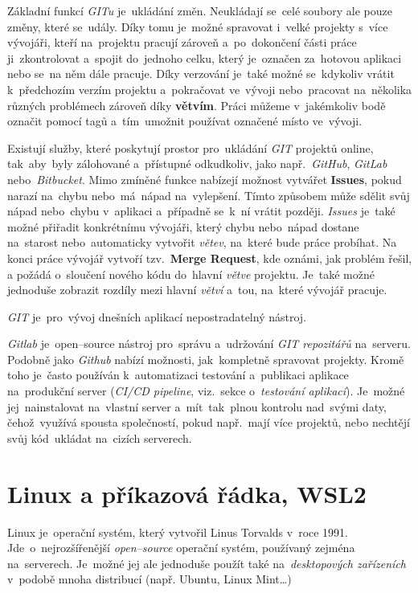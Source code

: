 \documentclass[11pt,a4paper]{report}
\begin{document}
            Základní funkcí \emph{GITu} je~ukládání změn. Neukládají se~celé soubory ale pouze změny, které se~udály. Díky tomu je~možné spravovat i~velké projekty s~více vývojáři, kteří na~projektu pracují zároveň a~po~dokončení části práce ji~zkontrolovat a~spojit do~jednoho celku, který je~označen za~hotovou aplikaci nebo se~na něm dále pracuje. Díky verzování je~také možné se~kdykoliv vrátit k~předchozím verzím projektu a~pokračovat ve~vývoji nebo~pracovat na~několika různých problémech zároveň díky \textbf{větvím}. Práci můžeme v~jakémkoliv bodě označit pomocí tagů a~tím~umožnit používat označené místo ve~vývoji.

            Existují služby, které poskytují prostor pro~ukládání \emph{GIT} projektů online, tak~aby~byly zálohované a~přístupné odkudkoliv, jako např.~\emph{GitHub}, \emph{GitLab} nebo~\emph{Bitbucket}. Mimo zmíněné funkce nabízejí možnost vytvářet \textbf{Issues}, pokud narazí na~chybu nebo~má~nápad na~vylepšení. Tímto způsobem může sdělit svůj nápad nebo~chybu v~aplikaci a~případně se~k~ní vrátit později. \emph{Issues} je~také možné přiřadit konkrétnímu vývojáři, který chybu nebo~nápad dostane na~starost nebo~automaticky vytvořit \emph{větev}, na~které bude práce probíhat. Na konci práce vývojář vytvoří tzv.~\textbf{Merge Request}, kde oznámi, jak problém řešil, a požádá o~sloučení nového kódu do~hlavní \emph{větve} projektu. Je~také možné jednoduše zobrazit rozdíly mezi hlavní \emph{větví} a~tou, na~které vývojář pracuje.
            
            \emph{GIT} je~pro~vývoj dnešních aplikací nepostradatelný nástroj. \cite{gitscmBook}
            
            \emph{Gitlab} je~open--source nástroj pro~správu a~udržování \emph{GIT repozitářů} na~serveru. Podobně jako \emph{Github} nabízí možnosti, jak~kompletně spravovat projekty. Kromě toho je~často používán k~automatizaci testování a~publikaci aplikace na~produkční server (\emph{CI/CD pipeline}, viz.~sekce o~\emph{testování aplikací}). Je~možné jej~nainstalovat na~vlastní server a~mít~tak~plnou kontrolu nad~svými daty, čehož~využívá spousta společností, pokud např.~mají více projektů, nebo nechtějí svůj kód~ukládat na~cizích serverech. \cite{geerlings2022gitlab, gitlab:CICD, gitlab:actions}

        \section{Linux a příkazová řádka, WSL2}
            Linux je~operační systém, který vytvořil Linus Torvalds v~roce 1991. Jde~o~nejrozšířenější \emph{open--source} operační systém, používaný zejména na~serverech. Je~možné jej ale jednoduše použít také na~\emph{desktopových zařízeních} v~podobě mnoha distribucí (např. Ubuntu, Linux Mint\dots)
            
\end{document}
